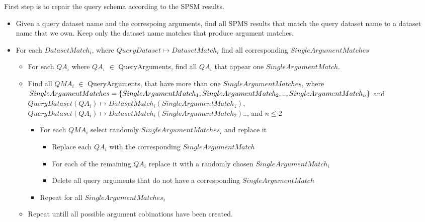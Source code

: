\documentclass[a4paper,10pt]{article}
\begin{document}
First step is to repair the query schema according to the SPSM results. 
\begin{itemize}
 \item Given a query dataset name and the correspoing arguments, find all SPMS results that match the query dataset name to 
a dataset name that we own. Keep only the dataset name matches that produce argument matches.
\item For each $DatasetMatch_i$, where $QueryDataset \mapsto DatasetMatch_i$ find all corresponding $SingleArgumentMatches$
    \begin{itemize}
    \item For each $QA_i$ where $QA_i$ $\in$ QueryArguments, find all $QA_i$ that appear  one $SingleArgumentMatch$. 
     \item Find all  $QMA_i$ $\in$ QueryArguments, that have more than one $SingleArgumentMatches$, where  $SingleArgumentMatches= \{ SingleArgumentMatch_1, \\SingleArgumentMatch_2, .., SingleArgumentMatch_n\}$ and 
$QueryDataset(QA_i) \mapsto DatasetMatch_i(SingleArgumentMatch_1)$, \\
$QueryDataset(QA_i) \mapsto DatasetMatch_i(SingleArgumentMatch_2)$.., and $n \leq 2$
    \begin{itemize}
\item  For each $QMA_i$ select randomly $SingleArgumentMatches_i$ and replace it

    \begin{itemize}
     \item Replace each $QA_i$ with the corresponding  $SingleArgumentMatch$
      \item For each of the remaining $QA_i$ replace it with a randomly chosen  $SingleArgumentMatch_i$ 
      \item Delete all query arguments that do not have a corresponding $SingleArgumentMatch$
    \end{itemize}
\item Repeat for all $SingleArgumentMatches_i$
\end{itemize}

 \item Repeat untill all possible argument cobinations have been created. 


    \end{itemize}



\end{itemize}
\end{document}

